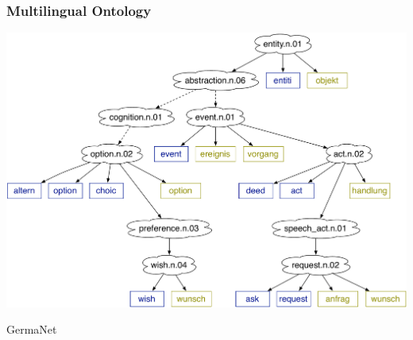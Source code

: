 \fi

\frame
{
  \frametitle{Multilingual Ontology}

\begin{center}
\includegraphics[width=0.75\linewidth]{mlslda/germanet}
\end{center}

\vspace{-.8cm}

\begin{center}
	\item GermaNet~\cite{hamp-97,kunze-02}
\end{center}

}


\ifhighlevel

\else

